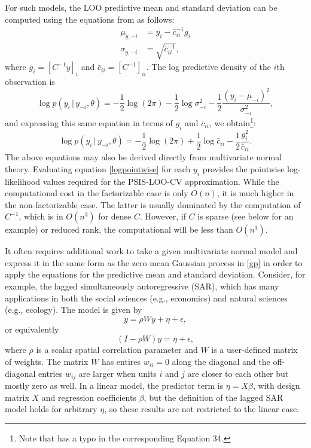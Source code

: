 \documentclass[11pt]{article}
\begin{document}
For such models, the LOO predictive mean and standard deviation can be computed
using the equations from \cite{sundararajan2001} as follows:
%
\begin{align}
\label{ypredpars}
  \mu_{\tilde{y},-i} &= y_i-\bar{c}_{ii}^{-1} g_i \nonumber \\
  \sigma_{\tilde{y},-i} &= \sqrt{\bar{c}_{ii}^{-1}},
\end{align}
%
where $g_i = \left[C^{-1} y\right]_i$ and
$\bar{c}_{ii} = \left[C^{-1}\right]_{ii}$.
The log predictive density of the $i$th observation is
%
\begin{equation}
  \log p(y_i \,|\, y_{-i},\theta)
  = - \frac{1}{2}\log(2\pi)
  - \frac{1}{2}\log \sigma^2_{-i}
  - \frac{1}{2}\frac{(y_i-\mu_{-i})^2}{\sigma^2_{-i}},
\end{equation}
%
and expressing this same equation in terms of $g_i$ and $\bar{c}_{ii}$, we
obtain\footnote{ Note that \cite{vehtari2016} has a typo in the corresponding
Equation 34.}:
%
\begin{equation}
\label{logpointwise}
  \log p(y_i \,|\, y_{-i},\theta)
  = - \frac{1}{2}\log(2\pi)
  + \frac{1}{2}\log \bar{c}_{ii}
  - \frac{1}{2}\frac{g_i^2}{\bar{c}_{ii}}.
\end{equation}
%
The above equations may also be derived directly from multivariate normal theory. 
Evaluating equation \eqref{logpointwise} for each $y_i$ provides the pointwise
log-likelihood values required for the PSIS-LOO-CV approximation. 
While the computational cost in the factorizable case is only $O(n)$, 
it is much higher in the non-factorizable case. The latter is usually dominated by the 
computation of $C^{-1}$, which is in $O(n^3)$ for dense $C$. However, if $C$ is 
sparse (see below for an example) or reduced rank, the computational will be less than $O(n^3)$.

It often requires additional work to take a given multivariate normal
model and express it in the same form as the zero mean Gaussian process 
in \eqref{gp} in order to apply the equations for the predictive 
mean and standard deviation. Consider, for example, the lagged simultaneously 
autoregressive (SAR), which has many applications in both the social sciences 
(e.g., economics) and natural sciences (e.g., ecology). The model is given by 
%
\begin{equation}
y = \rho W y + \eta + \epsilon,
\end{equation}
%
or equivalently 
%
\begin{equation}
(I - \rho W) y = \eta + \epsilon,
\end{equation}
%
where $\rho$ is a scalar spatial correlation parameter and $W$ is a user-defined matrix of weights. 
The matrix $W$ has entires $w_{ii} = 0$ along the diagonal and the off-diagonal entries $w_{ij}$
are larger when units $i$ and $j$ are closer to each other but mostly zero as well. In a linear model, 
the predictor term is $\eta = X \beta$, with design matrix $X$ and regression coefficients $\beta$,
but the definition of the lagged SAR model holds for arbitrary $\eta$, so 
these results are not restricted to the linear case.  
\end{document}
